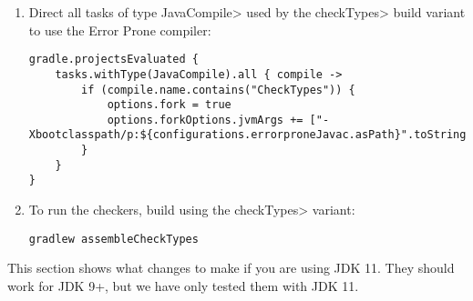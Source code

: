 \begin{enumerate}
\item Direct all tasks of type \<JavaCompile> used by the \<checkTypes>
  build variant to use the Error Prone compiler:
\begin{mysmall}
\begin{Verbatim}
gradle.projectsEvaluated {
    tasks.withType(JavaCompile).all { compile ->
        if (compile.name.contains("CheckTypes")) {
            options.fork = true
            options.forkOptions.jvmArgs += ["-Xbootclasspath/p:${configurations.errorproneJavac.asPath}".toString()]
        }
    }
}
\end{Verbatim}
\end{mysmall}

\item To run the checkers, build using the \<checkTypes> variant:
\begin{Verbatim}
gradlew assembleCheckTypes
\end{Verbatim}
\end{enumerate}

This section shows what changes to make if you are using JDK 11.  They should work for JDK 9+, but
we have only tested them with JDK 11.

